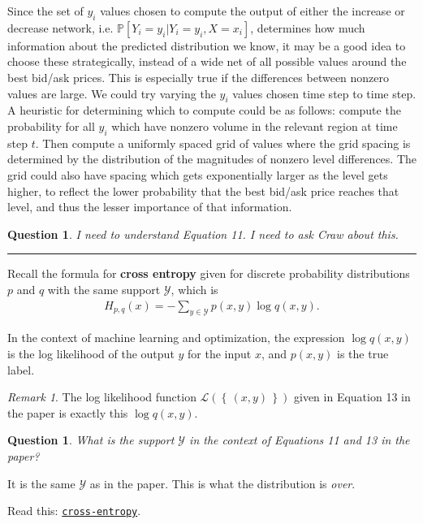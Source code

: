 \documentclass[12pt, reqno]{amsart}
\theoremstyle{definition}
\theoremstyle{definition}
\theoremstyle{plain}
\newtheorem{Ques}[theorem]{Question}
\theoremstyle{definition}
\theoremstyle{remark}
\newtheorem{rem}[theorem]{Remark}
\newcommand{\bee}{\begin{equation}\begin{aligned}}
\newcommand{\eee}{\end{aligned}\end{equation}}
\renewcommand{\'}{\hspace{0.5mm}'}			%
\renewcommand{\Set}[1]{\left\{\,#1\,\right\}}	%
\newcommand{\hrul}{\vspace{3mm}\hrule\vspace{3mm}}
\begin{document}
Since the set of $y_i$ values chosen to compute the output of either the increase or decrease network, i.e. $\mathbb{P}[Y_i = y_i|Y_i = y_i, X = x_i]$, determines how much information about the predicted distribution we know, it may be a good idea to choose these strategically, instead of a wide net of all possible values around the best bid/ask prices. This is especially true if the differences between nonzero values are large. We could try varying the $y_i$ values chosen time step to time step. A heuristic for determining which to compute could be as follows: compute the probability for all $y_i$ which have nonzero volume in the relevant region at time step $t$. Then compute a uniformly spaced grid of values where the grid spacing is determined by the distribution of the magnitudes of nonzero level differences. The grid could also have spacing which gets exponentially larger as the level gets higher, to reflect the lower probability that the best bid/ask price reaches that level, and thus the lesser importance of that information. 

\begin{Ques}
	I need to understand Equation 11. I need to ask Craw about this. 
\end{Ques}

\hrul 

Recall the formula for \textbf{cross entropy} given for discrete probability distributions $p$ and $q$ with the same support $\mathcal{Y}$, which is 
\bee
	H_{p,q}(x) = - \sum_{y \in \mathcal{Y}}p(x,y)\log q(x,y). 
\eee

In the context of machine learning and optimization, the expression $\log q(x,y)$ is the log likelihood of the output $y$ for the input $x$, and $p(x,y)$ is the true label. 

\begin{rem}
	The log likelihood function $\mathcal{L}(\Set{(x,y)})$ given in Equation 13 in the paper is exactly this $\log q(x,y)$. 
\end{rem}

\begin{Ques}
	What is the support $\mathcal{Y}$ in the context of Equations 11 and 13 in the paper?  
\end{Ques}

It is the same $\mathcal{Y}$ as in the paper. This is what the distribution is \textit{over}. 

Read this: \href{https://datascience.stackexchange.com/questions/9302/the-cross-entropy-error-function-in-neural-networks}{\texttt{cross-entropy}}. 
\end{document}
